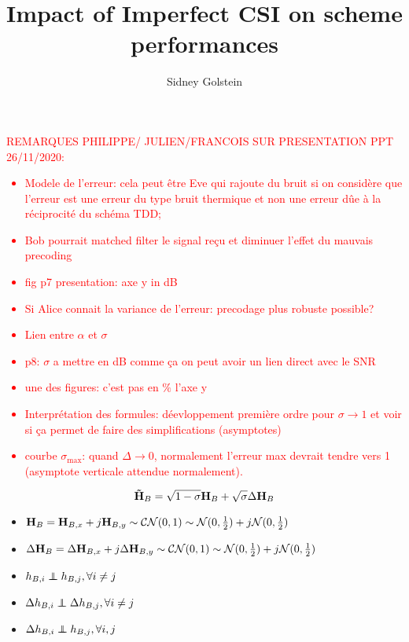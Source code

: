 \documentclass[12pt]{article}
\begin{document}
\title{\textbf{Impact of Imperfect CSI on scheme performances}}
\author{Sidney Golstein}
\maketitle

\textcolor{red}{REMARQUES PHILIPPE/ JULIEN/FRANCOIS SUR PRESENTATION PPT 26/11/2020:
\begin{itemize}
		\item Modele de l'erreur: cela peut être Eve qui rajoute du bruit si on considère que l'erreur est une erreur du type bruit thermique et non une erreur dûe à la réciprocité du schéma TDD;
		\item Bob pourrait matched filter le signal reçu et diminuer l'effet du mauvais precoding
		\item fig p7 presentation: axe y in dB
		\item Si Alice connait la variance de l'erreur: precodage plus robuste possible?
		\item Lien entre $\alpha$ et $\sigma$
		\item p8: $\sigma$ a mettre en dB comme ça on peut avoir un lien direct avec le SNR
		\item une des figures: c'est pas en $\%$ l'axe y
		\item Interprétation des formules: déevloppement première ordre pour $\sigma \to 1$ et voir si ça permet de faire des simplifications (asymptotes)
		\item courbe $\sigma_{\text{max}}$: quand $\Delta \to 0$, normalement l'erreur max devrait tendre vers 1 (asymptote verticale attendue normalement).
\end{itemize}}


\begin{equation}
   \boldsymbol{\mathrm{\tilde{H}}}_B = \sqrt{1-\sigma} \boldsymbol{\mathrm{H}}_B  + \sqrt{\sigma} \Delta \boldsymbol{\mathrm{H}}_B  
\end{equation}

\begin{itemize}
	\item  $\boldsymbol{\mathrm{H}}_B = \boldsymbol{\mathrm{H}}_{B,x} + j\boldsymbol{\mathrm{H}}_{B,y} \sim \mathcal{CN}(0,1) \sim \mathcal{N}(0,\frac{1}{2}) + j \mathcal{N}(0,\frac{1}{2}) $
	\item  $\Delta\boldsymbol{\mathrm{H}}_B = \Delta\boldsymbol{\mathrm{H}}_{B,x} + j\Delta\boldsymbol{\mathrm{H}}_{B,y} \sim \mathcal{CN}(0,1) \sim \mathcal{N}(0,\frac{1}{2}) + j \mathcal{N}(0,\frac{1}{2}) $
	\item $h_{B,i} \indep h_{B,j}, \forall i \neq j$
	\item $\Delta h_{B,i} \indep \Delta h_{B,j}, \forall i \neq j$
	\item $\Delta h_{B,i} \indep h_{B,j}, \forall i,j$
\end{itemize}
\end{document}
